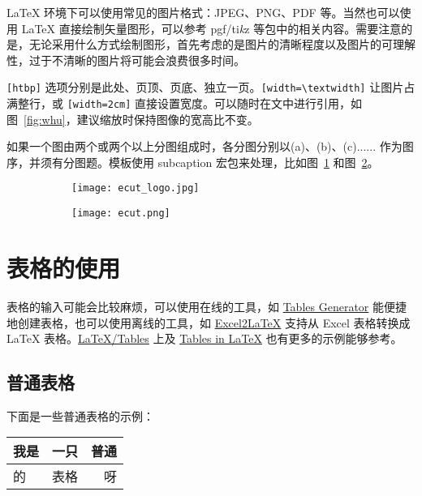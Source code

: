 \LaTeX{} 环境下可以使用常见的图片格式：JPEG、PNG、PDF 等。当然也可以使用 \LaTeX{} 直接绘制矢量图形，可以参考 pgf/ti\emph{k}z 等包中的相关内容。需要注意的是，无论采用什么方式绘制图形，首先考虑的是图片的清晰程度以及图片的可理解性，过于不清晰的图片将可能会浪费很多时间。

\verb|[htbp]| 选项分别是此处、页顶、页底、独立一页。\verb|[width=\textwidth]| 让图片占满整行，或 \verb|[width=2cm]| 直接设置宽度。可以随时在文中进行引用，如图~\ref{fig:whu}，建议缩放时保持图像的宽高比不变。

如果一个图由两个或两个以上分图组成时，各分图分别以(a)、(b)、(c)...... 作为图序，并须有分图题。模板使用 subcaption 宏包来处理，比如图~\ref{fig:subfig-a} 和图~\ref{fig:subfig-b}。

\begin{figure}[h]
  \centering
  \begin{subfigure}{0.25\textwidth}
    \texttt{[image: ecut\_logo.jpg]}
    \label{fig:subfig-a}
  \end{subfigure}\qquad
  \begin{subfigure}{0.65\textwidth}
    \texttt{[image: ecut.png]}
    \label{fig:subfig-b}
  \end{subfigure}
  \label{fig:multi-image}
\end{figure}

\section{表格的使用}
表格的输入可能会比较麻烦，可以使用在线的工具，如 \href{https://www.tablesgenerator.com/}{Tables Generator} 能便捷地创建表格，也可以使用离线的工具，如 \href{https://ctan.org/pkg/excel2latex}{Excel2LaTeX} 支持从 Excel 表格转换成 \LaTeX{} 表格。\href{https://en.wikibooks.org/wiki/LaTeX/Tables}{LaTeX/Tables} 上及 \href{https://www.tug.org/pracjourn/2007-1/mori/mori.pdf}{Tables in LaTeX} 也有更多的示例能够参考。

\subsection{普通表格}
下面是一些普通表格的示例：

\begin{table}[ht]
  \centering
  \label{tab:1}
  \begin{tabular}{|l|c|r|}
    \hline
    我是 & 一只 & 普通 \\
    \hline
    的   & 表格 & 呀   \\
    \hline
  \end{tabular}
\end{table}

